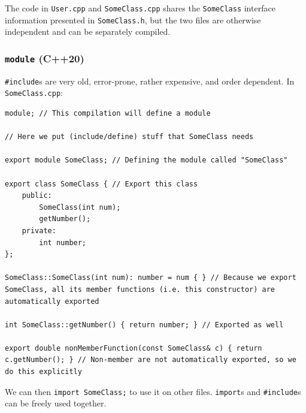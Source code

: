 \documentclass[table, xcdraw]{article}%
\begin{document}

The  code  in \texttt{User.cpp} and \texttt{SomeClass.cpp} shares the \texttt{SomeClass} interface information presented in \texttt{SomeClass.h}, but the two files are otherwise independent and can be separately compiled. 

\subsubsection{\texttt{module} (C++20)} \label{modules}

\texttt{#include}s are very old, error-prone,  rather expensive, and order dependent. In \texttt{SomeClass.cpp}:

\begin{verbatim}
module; // This compilation will define a module

// Here we put (include/define) stuff that SomeClass needs

export module SomeClass; // Defining the module called "SomeClass"

export class SomeClass { // Export this class
    public:
        SomeClass(int num);
        getNumber();
    private:
        int number;
};

SomeClass::SomeClass(int num): number = num { } // Because we export SomeClass, all its member functions (i.e. this constructor) are automatically exported

int SomeClass::getNumber() { return number; } // Exported as well

export double nonMemberFunction(const SomeClass& c) { return c.getNumber(); } // Non-member are not automatically exported, so we do this explicitly
\end{verbatim}

We can then \texttt{import SomeClass;} to use it on other files. \texttt{import}s and \texttt{#include}s can be freely used together.
\end{document}
